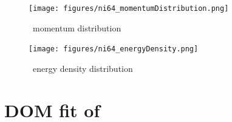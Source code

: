 \begin{figure}[H]
    \centering
    \texttt{[image: figures/ni64\_momentumDistribution.png]}
    \caption{\niFour\ momentum distribution}
    \label{DOMFitData_ni64_momentumDistribution}
\end{figure}

\begin{figure}[H]
    \centering
    \texttt{[image: figures/ni64\_energyDensity.png]}
    \caption{\niFour\ energy density distribution}
    \label{DOMFitData_ni64_energyDensity}
\end{figure}

\section{DOM fit of \snTwelve}

